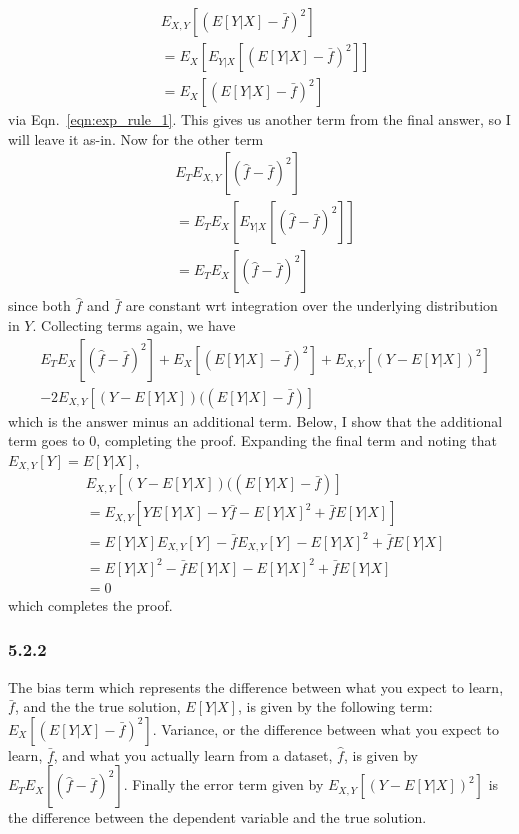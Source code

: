 \documentclass[12pt]{amsart}
\begin{document}
\begin{equation} 
\begin{split}
& E_{X,Y}[(E[Y|X] - \bar{f})^2] \\
& = E_X[E_{Y|X}[(E[Y|X] - \bar{f})^2]] \\
& = E_X[(E[Y|X] - \bar{f})^2]
\end{split}
\end{equation}
via Eqn.~\ref{eqn:exp_rule_1}.  This gives us another term from the final answer, so I will leave it as-in.  Now for the other term
\begin{equation}
\begin{split}
& E_TE_{X,Y}[(\hat{f} - \bar{f})^2] \\
& = E_TE_X[E_{Y|X}[(\hat{f} - \bar{f})^2]] \\
& = E_TE_X[(\hat{f} - \bar{f})^2]
\end{split}
\end{equation}
since both $\hat{f}$ and $\bar{f}$ are constant wrt integration over the underlying distribution in $Y$.  Collecting terms again, we have
\begin{equation} \label{eqn:5.2almost_ans}
\begin{split}
&E_TE_X[(\hat{f} - \bar{f})^2] + E_X[(E[Y|X] - \bar{f})^2] + E_{X,Y}[(Y-E[Y|X])^2] \\
& - 2E_{X,Y}[(Y-E[Y|X])((E[Y|X] - \bar{f})]
\end{split}
\end{equation}
which is the answer minus an additional term.  Below, I show that the additional term goes to 0, completing the proof.  Expanding the final term and noting that $E_{X,Y}[Y] = E[Y|X]$, 
\begin{equation}
\begin{split}
& E_{X,Y}[(Y-E[Y|X])((E[Y|X] - \bar{f})] \\
& = E_{X,Y}[YE[Y|X] - Y\bar{f} - E[Y|X]^2 + \bar{f}E[Y|X]] \\
& = E[Y|X]E_{X,Y}[Y] - \bar{f}E_{X,Y}[Y] - E[Y|X]^2 + \bar{f}E[Y|X] \\
& = E[Y|X]^2 - \bar{f}E[Y|X] - E[Y|X]^2 + \bar{f}E[Y|X] \\
& = 0
\end{split}
\end{equation}
which completes the proof.

\subsubsection*{5.2.2}
The bias term which represents the difference between what you expect to learn, $\bar{f}$, and the the true solution, $E[Y|X]$, is given by the following term: $E_X[(E[Y|X] - \bar{f})^2]$.  Variance, or the difference between what you expect to learn, $\bar{f}$, and what you actually learn from a dataset, $\hat{f}$, is given by $E_TE_X[(\hat{f} - \bar{f})^2]$.  Finally the error term given by $E_{X,Y}[(Y-E[Y|X])^2]$ is the difference between the dependent variable and the true solution.
\end{document}
